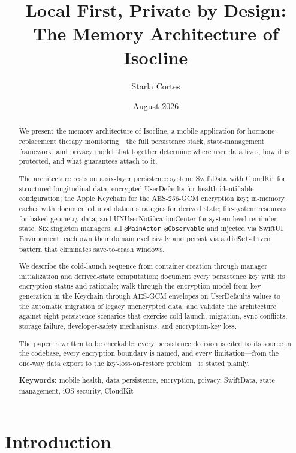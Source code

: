 \documentclass[11pt,a4paper]{article}
\title{\textbf{Local First, Private by Design:}\\[0.3em]
\large The Memory Architecture of Isocline}
\author{Starla Cortes}
\date{August 2026}
\newcommand{\code}[1]{\texttt{\small #1}}
\begin{document}
\maketitle

\begin{abstract}
\noindent
We present the memory architecture of Isocline, a mobile application for hormone
replacement therapy monitoring---the full persistence stack, state-management
framework, and privacy model that together determine where user data lives,
how it is protected, and what guarantees attach to it.

The architecture rests on a six-layer persistence system: SwiftData with
CloudKit for structured longitudinal data; encrypted UserDefaults for
health-identifiable configuration; the Apple Keychain for the AES-256-GCM
encryption key; in-memory caches with documented invalidation strategies for
derived state; file-system resources for baked geometry data; and
UNUserNotificationCenter for system-level reminder state. Six singleton
managers, all \code{@MainActor @Observable} and injected via SwiftUI
Environment, each own their domain exclusively and persist via a
\code{didSet}-driven pattern that eliminates save-to-crash windows.

We describe the cold-launch sequence from container creation through
manager initialization and derived-state computation; document every
persistence key with its encryption status and rationale; walk through the
encryption model from key generation in the Keychain through AES-GCM
envelopes on UserDefaults values to the automatic migration of legacy
unencrypted data; and validate the architecture against eight persistence
scenarios that exercise cold launch, migration, sync conflicts, storage
failure, developer-safety mechanisms, and encryption-key loss.

The paper is written to be checkable: every persistence decision is cited to
its source in the codebase, every encryption boundary is named, and every
limitation---from the one-way data export to the key-loss-on-restore
problem---is stated plainly.

\textbf{Keywords:} mobile health, data persistence, encryption, privacy,
SwiftData, state management, iOS security, CloudKit
\end{abstract}

\tableofcontents
\clearpage

\section{Introduction}
\label{sec:intro}
\end{document}
